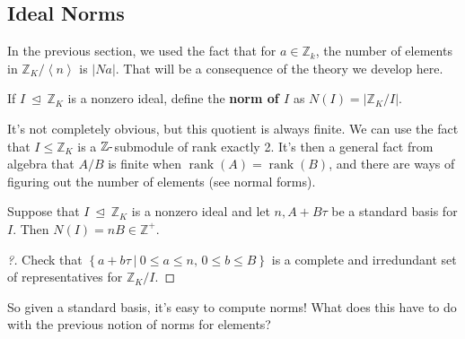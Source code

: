 \hypertarget{ideal-norms}{%
\subsection{Ideal Norms}\label{ideal-norms}}

In the previous section, we used the fact that for
\(a\in {\mathbb{Z}}_k\), the number of elements in
\({\mathbb{Z}}_K / \left\langle{ n }\right\rangle\) is
\({\left\lvert { N a } \right\rvert}\). That will be a consequence of
the theory we develop here.

\begin{definition}[?]

If \(I{~\trianglelefteq~}{\mathbb{Z}}_K\) is a nonzero ideal, define the
\textbf{norm of \(I\)} as
\(N(I) = {\left\lvert {{\mathbb{Z}}_K / I} \right\rvert}\).

\end{definition}

\begin{remark}

It's not completely obvious, but this quotient is always finite. We can
use the fact that \(I\leq {\mathbb{Z}}_K\) is a
\({\mathbb{Z}}{\hbox{-}}\)submodule of rank exactly 2. It's then a
general fact from algebra that \(A/B\) is finite when
\(\operatorname{rank}(A) = \operatorname{rank}(B)\), and there are ways
of figuring out the number of elements (see normal forms).

\end{remark}

\begin{proposition}[?]

Suppose that \(I{~\trianglelefteq~}{\mathbb{Z}}_K\) is a nonzero ideal
and let \(n, A+B \tau\) be a standard basis for \(I\). Then
\(N(I) = nB \in {\mathbb{Z}}^+\).

\end{proposition}

\begin{proof}[?]

Check that
\(\left\{{ a + b \tau {~\mathrel{\Big|}~}0\leq a \leq n,\, 0 \leq b \leq B}\right\}\)
is a complete and irredundant set of representatives for
\({\mathbb{Z}}_K/I\).

\end{proof}

\begin{remark}

So given a standard basis, it's easy to compute norms! What does this
have to do with the previous notion of norms for elements?

\end{remark}

